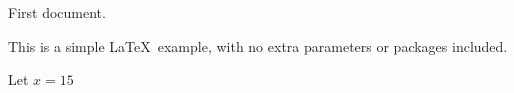 \documentclass{article}
\begin{document}
First document.

This is a simple \LaTeX\ example, with no 
extra parameters or packages included.

Let $x = 15$
\end{document}
